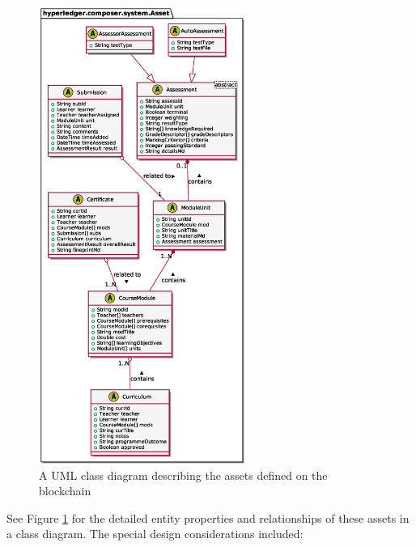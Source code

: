 \begin{figure}[!ht]
	\centering
	\includegraphics[width=0.6\textwidth]{assets}
	\caption[Assets Class Diagram]
	{A UML class diagram describing the assets defined on the blockchain}
	\label{fig:assets}
\end{figure}

See Figure \ref{fig:assets} for the detailed entity properties and relationships of these assets
in a class diagram. The special design considerations included:

